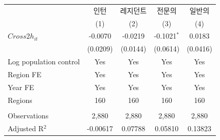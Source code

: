 \begingroup
\centering
\begin{tabular}{lcccc}
   \toprule
                          & 인턴     & 레지던트 & 전문의        & 일반의 \\   
                          & (1)      & (2)      & (3)           & (4)\\  
   \midrule 
   $Cross2h_{it}$         & -0.0070  & -0.0219  & -0.1021$^{*}$ & 0.0183\\   
                          & (0.0209) & (0.0144) & (0.0614)      & (0.0416)\\   
   Log population control & Yes      & Yes      & Yes           & Yes\\  
   Region FE              & Yes      & Yes      & Yes           & Yes\\  
   Year FE                & Yes      & Yes      & Yes           & Yes\\  
   Regions                & 160      & 160      & 160           & 160\\  
    \\
   Observations           & 2,880    & 2,880    & 2,880         & 2,880\\  
   Adjusted R$^2$         & -0.00617 & 0.07788  & 0.05810       & 0.13823\\  
   \bottomrule
\end{tabular}
\par\endgroup
